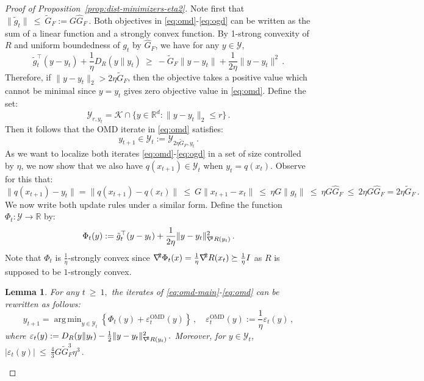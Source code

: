 \documentclass[a4paper,11pt,fullpage]{article}
\def\Y{{\mathcal Y}}
\newcommand{\K}{\ensuremath{\mathcal K}}
\theoremstyle{plain}
\newtheorem{lemma}{Lemma}
\theoremstyle{definition}
\theoremstyle{plain}
\DeclareMathOperator*{\argmin}{arg\,min}
\newcommand{\reals}{\mathbb{R}}
\renewcommand{\leq}{~\le~}
\renewcommand{\geq}{~\ge~}
\let\nablaold\nabla
\renewcommand{\nabla}{\nablaold\mkern-2.5mu}
\begin{document}
\begin{proof}[Proof of Proposition~\ref{prop:dist-minimizers-eta2}]

Note first that $\|\tilde{g}_t\| \leq \tilde{G}_F := G \hat{G}_F\,.$ 
Both objectives in \eqref{eq:omd}-\eqref{eq:ogd} can be written as the sum of a linear function and a strongly convex function. 
By 1-strong convexity of $R$ and uniform boundedness of $g_t$ by $\hat{G}_F$, we have for any $y \in \Y$, 
\begin{equation*}
\tilde{g}_t^{\top}(y-y_t) +\frac{1}{\eta} D_R(y\|y_t) \geq - \tilde{G}_F \|y-y_t\| + \frac{1}{2\eta} \|y-y_t\|^2\,.
\end{equation*}
Therefore, if $\|y-y_t\|_2>2 \eta \tilde{G}_F$, then the objective takes a positive value which cannot be minimal since $y=y_t$ gives zero objective value in \eqref{eq:omd}. Define the set:  
\begin{equation*}
\Y_{r,y_t}=\K \cap \{y \in \reals^d: \|y-y_t\|_2 \le r\}\,.
\end{equation*}
Then it follows that the OMD iterate in \eqref{eq:omd} satisfies: 
\begin{equation}
\label{eq:y_t+1inY_t}
y_{t+1} \in \Y_t := \Y_{2\eta \tilde{G}_F,y_t}\,. 
\end{equation}
As we want to localize both iterates \eqref{eq:omd}-\eqref{eq:ogd} in a set of size controlled by $\eta$, we now show that we also have $q(x_{t+1}) \in \Y_t$ when $y_t = q(x_t)$. Observe for this that: 
\begin{equation*}
\|q(x_{t+1}) - y_t\| = \|q(x_{t+1}) - q(x_t)\| 
\leq G \|x_{t+1} - x_t \|
\leq \eta G \|g_t\| 
\leq \eta G \hat{G}_F 
\leq 2 \eta G \hat{G}_F 
= 2 \eta \tilde{G}_F\,. 
\end{equation*}
We now write both update rules under a similar form. 
Define the function $\Phi_t: \Y \to \mathbb{R}$ by: 
\begin{equation}
\label{eq:Phi_t}
\Phi_t(y) := \tilde{g}_t^{\top}(y - y_t) + \frac{1}{2\eta} \|y-y_t\|_{\nabla^2 R(y_t)}^2\,.
\end{equation}
Note that $\Phi_t$ is $\frac{1}{\eta}$-strongly convex since $\nabla^2 \Phi_t(x) = \frac{1}{\eta} \nabla^2 R(x_t) \succeq \frac{1}{\eta} I$ as $R$ is supposed to be $1$-strongly convex.  

\begin{tcolorbox}[colframe=white!, top=2pt,left=2pt,right=2pt,bottom=2pt] 
\begin{lemma}
\label{lem:omd-rewritten}
For any $t \geq 1,$ the iterates of \eqref{eq:omd-main}-\eqref{eq:omd} can be rewritten as follows:
\begin{equation*}
y_{t+1} =\argmin_{y\in \Y_t} \left\{ \Phi_t(y) + \varepsilon_t^{\mathrm{OMD}}(y) \right\}\,, \quad \varepsilon_t^{\mathrm{OMD}}(y) := \frac{1}{\eta} \varepsilon_t(y)\,,
\end{equation*}
where $\varepsilon_t(y):= D_R(y\|y_t) - \frac12 \|y-y_t\|_{\nabla^2 R(y_t)}^2\,.$ Moreover, for $y \in \Y_t$, $|\varepsilon_t(y)| \leq \frac{4}{3} G \tilde{G}_F^3 \eta^3\,.$
\end{lemma}
\end{tcolorbox}


\end{proof}
\end{document}
